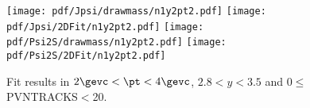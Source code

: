 \begin{figure}[H]
\begin{center}
\texttt{[image: pdf/Jpsi/drawmass/n1y2pt2.pdf]}
\texttt{[image: pdf/Jpsi/2DFit/n1y2pt2.pdf]}
\vspace*{-0.5cm}
\texttt{[image: pdf/Psi2S/drawmass/n1y2pt2.pdf]}
\texttt{[image: pdf/Psi2S/2DFit/n1y2pt2.pdf]}
\vspace*{-0.5cm}
\end{center}
\caption{Fit results in $2\gevc<\pt<4\gevc$, $2.8<y<3.5$ and 0$\leq$PVNTRACKS$<$20.}
\label{Fitn1y2pt2}
\end{figure}
